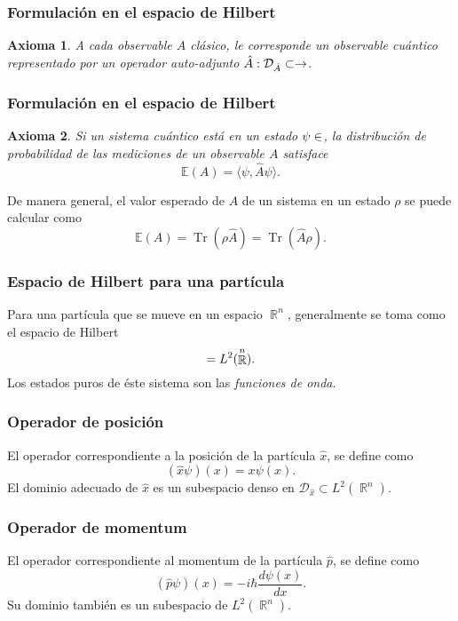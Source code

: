 \documentclass{beamer}
\newtheorem{axiom}{Axioma}
\DeclareMathOperator{\R}{\mathbb{R}}
\let\H\relax
\DeclareMathOperator{\H}{\mathcal H}
\DeclareMathOperator{\Tr}{Tr}
\begin{document}
\begin{frame}
  \frametitle{Formulación en el espacio de Hilbert}

  \begin{axiom}
    A cada observable $A$ clásico, le corresponde un
    observable cuántico representado por un operador
    auto-adjunto $\hat{A} : \mathcal D_{\hat{A}} \subset \H
    \to \H$.
  \end{axiom}
\end{frame}

\begin{frame}
  \frametitle{Formulación en el espacio de Hilbert}

  \begin{axiom}
    Si un sistema cuántico está en un estado $\psi \in \H$,
    la distribución de probabilidad de las mediciones de un
    observable $A$ satisface
    \[
      \mathbb E(A)
      = \langle \psi, \hat{A}\psi \rangle.
    \] 
  \end{axiom}

  De manera general, el valor esperado de $A$ de un sistema
  en un estado $\rho$ se puede calcular como
  \[
    \mathbb E(A)
    = \Tr\left( \rho \hat{A} \right)
    = \Tr\left( \hat{A} \rho \right).
  \] 
\end{frame}

\begin{frame}
  \frametitle{Espacio de Hilbert para una partícula}

  Para una partícula que se mueve en un espacio $\R^{n}$,
  generalmente se toma como el espacio de Hilbert 
  \[
    \H = L^2(\R^{n}).
  \] 
  Los estados puros de éste sistema son las
  \textit{funciones de onda}.
\end{frame}

\begin{frame}
  \frametitle{Operador de posición}

  \begin{definition}
    El operador correspondiente a la posición de la
    partícula $\hat{x}$, se define como
    \[
      (\hat{x}\psi)(x)
      = x\psi(x).
    \] 
    El dominio adecuado de $\hat{x}$ es un subespacio denso
    en $\mathcal D_{\hat{x}} \subset L^2(\R^{n})$.
  \end{definition}
\end{frame}

\begin{frame}
  \frametitle{Operador de momentum}

  \begin{definition}
    El operador correspondiente al momentum de la partícula
    $\hat{p}$, se define como
    \[
      (\hat{p}\psi)(x)
      = -i\hbar \frac{d\psi(x)}{dx}.
    \] 
    Su dominio también es un subespacio de $L^2(\R^{n})$.
  \end{definition}
\end{frame}
\end{document}
